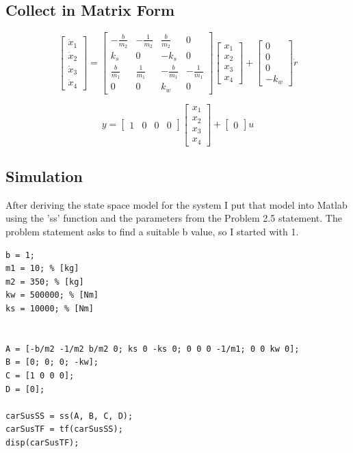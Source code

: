 \documentclass{article}
\begin{document}
\subsection{Collect in Matrix Form}
\[
\begin{bmatrix}
\dot{x}_1 \\
\dot{x}_2 \\
\dot{x}_3 \\
\dot{x}_4
\end{bmatrix}
=
\begin{bmatrix}
-\frac{b}{m_2} & -\frac{1}{m_2} & \frac{b}{m_2} & 0 \\
k_s & 0 & -k_s & 0 \\
\frac{b}{m_1} & \frac{1}{m_1} & -\frac{b}{m_1} & -\frac{1}{m_1} \\
0 & 0 & k_w & 0
\end{bmatrix}
\begin{bmatrix}
x_1 \\
x_2 \\
x_3 \\
x_4
\end{bmatrix}
+
\begin{bmatrix}
0 \\
0 \\
0 \\
-k_w
\end{bmatrix}
\dot{r}
\]

\[
y = 
\begin{bmatrix}
1 & 0 & 0 & 0
\end{bmatrix}
\begin{bmatrix}
x_1 \\
x_2 \\
x_3 \\
x_4
\end{bmatrix}
+
\begin{bmatrix}
0
\end{bmatrix}
u
\]

\subsection*{Simulation}

After deriving the state space model for the system I put that model into Matlab using the 'ss' function and the parameters from the Problem 2.5 statement.
The problem statement asks to find a suitable b value, so I started with 1.

\begin{lstlisting}[style=matlabstyle]
b = 1;
m1 = 10; % [kg]
m2 = 350; % [kg]
kw = 500000; % [Nm]
ks = 10000; % [Nm]


A = [-b/m2 -1/m2 b/m2 0; ks 0 -ks 0; 0 0 0 -1/m1; 0 0 kw 0]; 
B = [0; 0; 0; -kw];       
C = [1 0 0 0];        
D = [0];  

carSusSS = ss(A, B, C, D);
carSusTF = tf(carSusSS);
disp(carSusTF);
\end{lstlisting}
\end{document}
